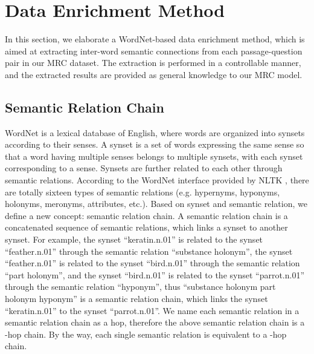 \documentclass[11pt,a4paper]{article}
\begin{document}
\section{Data Enrichment Method}
In this section, we elaborate a WordNet-based data enrichment method, which is aimed at extracting inter-word semantic connections from each passage-question pair in our MRC dataset. The extraction is performed in a controllable manner, and the extracted results are provided as general knowledge to our MRC model.

\subsection{Semantic Relation Chain}
WordNet is a lexical database of English, where words are organized into synsets according to their senses. A synset is a set of words expressing the same sense so that a word having multiple senses belongs to multiple synsets, with each synset corresponding to a sense. Synsets are further related to each other through semantic relations. According to the WordNet interface provided by NLTK \cite{birdsteven:2004}, there are totally sixteen types of semantic relations (e.g. hypernyms, hyponyms, holonyms, meronyms, attributes, etc.). Based on synset and semantic relation, we define a new concept: semantic relation chain. A semantic relation chain is a concatenated sequence of semantic relations, which links a synset to another synset. For example, the synset ``keratin.n.01'' is related to the synset ``feather.n.01'' through the semantic relation ``substance holonym'', the synset ``feather.n.01'' is related to the synset ``bird.n.01'' through the semantic relation ``part holonym'', and the synset ``bird.n.01'' is related to the synset ``parrot.n.01'' through the semantic relation ``hyponym'', thus ``substance holonym  part holonym  hyponym'' is a semantic relation chain, which links the synset ``keratin.n.01'' to the synset ``parrot.n.01''. We name each semantic relation in a semantic relation chain as a hop, therefore the above semantic relation chain is a -hop chain. By the way, each single semantic relation is equivalent to a -hop chain.
\end{document}
